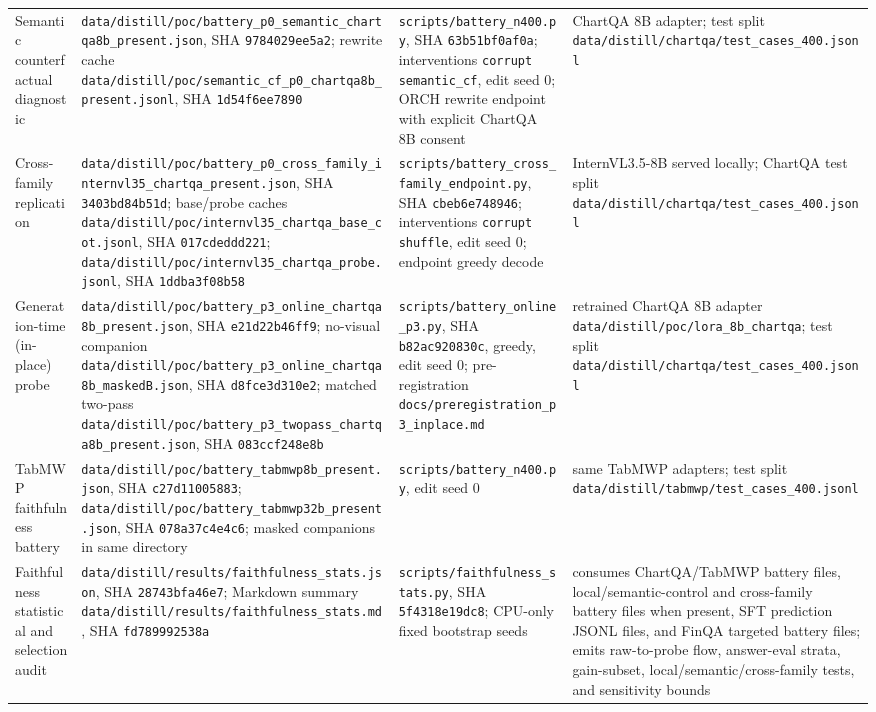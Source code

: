\documentclass[11pt]{article}
\begin{document}
\begin{table}[t]
\begin{tabular}{@{}L{0.18\textwidth}L{0.31\textwidth}L{0.25\textwidth}L{0.19\textwidth}@{}}
Semantic counterfactual diagnostic & \nolinkurl{data/distill/poc/battery_p0_semantic_chartqa8b_present.json}, SHA \texttt{9784029ee5a2}; rewrite cache \nolinkurl{data/distill/poc/semantic_cf_p0_chartqa8b_present.jsonl}, SHA \texttt{1d54f6ee7890} & \nolinkurl{scripts/battery_n400.py}, SHA \texttt{63b51bf0af0a}; interventions \texttt{corrupt semantic\_cf}, edit seed 0; ORCH rewrite endpoint with explicit ChartQA 8B consent & ChartQA 8B adapter; test split \nolinkurl{data/distill/chartqa/test_cases_400.jsonl} \\
Cross-family replication & \nolinkurl{data/distill/poc/battery_p0_cross_family_internvl35_chartqa_present.json}, SHA \texttt{3403bd84b51d}; base/probe caches \nolinkurl{data/distill/poc/internvl35_chartqa_base_cot.jsonl}, SHA \texttt{017cdeddd221}; \nolinkurl{data/distill/poc/internvl35_chartqa_probe.jsonl}, SHA \texttt{1ddba3f08b58} & \nolinkurl{scripts/battery_cross_family_endpoint.py}, SHA \texttt{cbeb6e748946}; interventions \texttt{corrupt shuffle}, edit seed 0; endpoint greedy decode & InternVL3.5-8B served locally; ChartQA test split \nolinkurl{data/distill/chartqa/test_cases_400.jsonl} \\
Generation-time (in-place) probe & \nolinkurl{data/distill/poc/battery_p3_online_chartqa8b_present.json}, SHA \texttt{e21d22b46ff9}; no-visual companion \nolinkurl{data/distill/poc/battery_p3_online_chartqa8b_maskedB.json}, SHA \texttt{d8fce3d310e2}; matched two-pass \nolinkurl{data/distill/poc/battery_p3_twopass_chartqa8b_present.json}, SHA \texttt{083ccf248e8b} & \nolinkurl{scripts/battery_online_p3.py}, SHA \texttt{b82ac920830c}, greedy, edit seed 0; pre-registration \nolinkurl{docs/preregistration_p3_inplace.md} & retrained ChartQA 8B adapter \nolinkurl{data/distill/poc/lora_8b_chartqa}; test split \nolinkurl{data/distill/chartqa/test_cases_400.jsonl} \\
TabMWP faithfulness battery & \nolinkurl{data/distill/poc/battery_tabmwp8b_present.json}, SHA \texttt{c27d11005883}; \nolinkurl{data/distill/poc/battery_tabmwp32b_present.json}, SHA \texttt{078a37c4e4c6}; masked companions in same directory & \nolinkurl{scripts/battery_n400.py}, edit seed 0 & same TabMWP adapters; test split \nolinkurl{data/distill/tabmwp/test_cases_400.jsonl} \\
Faithfulness statistical and selection audit & \nolinkurl{data/distill/results/faithfulness_stats.json}, SHA \texttt{28743bfa46e7}; Markdown summary \nolinkurl{data/distill/results/faithfulness_stats.md}, SHA \texttt{fd789992538a} & \nolinkurl{scripts/faithfulness_stats.py}, SHA \texttt{5f4318e19dc8}; CPU-only fixed bootstrap seeds & consumes ChartQA/TabMWP battery files, local/semantic-control and cross-family battery files when present, SFT prediction JSONL files, and FinQA targeted battery files; emits raw-to-probe flow, answer-eval strata, gain-subset, local/semantic/cross-family tests, and sensitivity bounds \\

\end{tabular}
\end{table}
\end{document}
